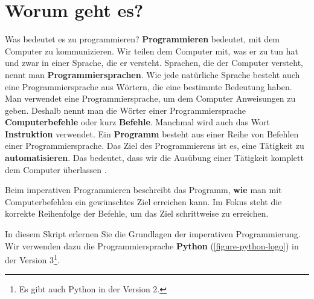 
\toggletrue{image}
\toggletrue{imagehover}

\chapter{Worum geht es?}
\label{chapter-worum-geht-es}

Was bedeutet es zu programmieren? \textbf{Programmieren} bedeutet, mit dem Computer zu kommunizieren. Wir teilen dem Computer mit, was er zu tun hat und zwar in einer Sprache, die er versteht. Sprachen, die der Computer versteht, nennt man \textbf{Programmiersprachen}. Wie jede natürliche Sprache besteht auch eine Programmiersprache aus Wörtern, die eine bestimmte Bedeutung haben. Man verwendet eine Programmiersprache, um dem Computer Anweisungen zu geben. Deshalb nennt man die Wörter einer Programmiersprache \textbf{Computerbefehle} oder kurz \textbf{Befehle}. Manchmal wird auch das Wort \textbf{Instruktion} verwendet. Ein \textbf{Programm} besteht aus einer Reihe von Befehlen einer Programmiersprache. Das Ziel des Programmierens ist es, eine Tätigkeit zu \textbf{automatisieren}. Das bedeutet, dass wir die Ausübung einer Tätigkeit komplett dem Computer überlassen \cite{einfach-informatik-programmieren}.

\begin{definition}
Beim imperativen Programmieren beschreibt das Programm, \textbf{wie} man mit Computerbefehlen ein gewünschtes Ziel erreichen kann. Im Fokus steht die korrekte Reihenfolge der Befehle, um das Ziel schrittweise zu erreichen.
\end{definition}

In diesem Skript erlernen Sie die Grundlagen der imperativen Programmierung. Wir verwenden dazu die Programmiersprache \textbf{Python} (\autoref{figure-python-logo}) in der Version 3\footnote{Es gibt auch Python in der Version 2.}.

